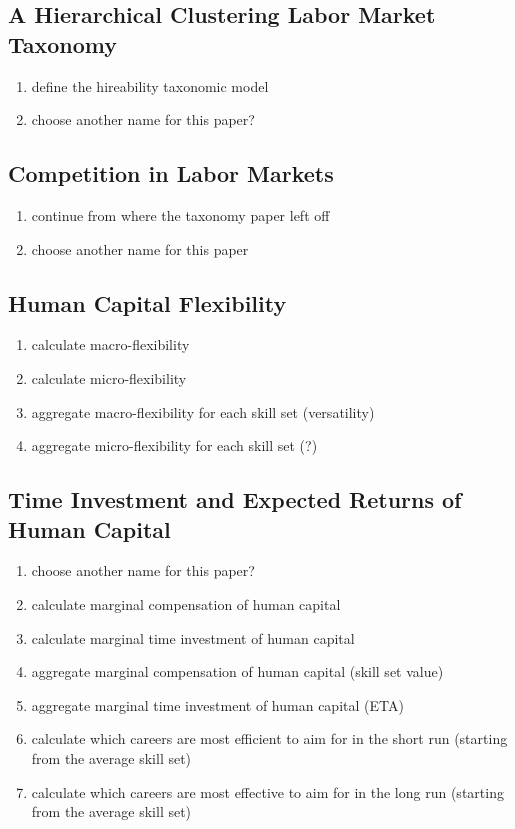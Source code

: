 \documentclass{elsarticle} %
\begin{document}
\subsection{A Hierarchical Clustering Labor Market Taxonomy}
\begin{enumerate}
    \item define the hireability taxonomic model
    \item choose another name for this paper?
\end{enumerate}

\subsection{Competition in Labor Markets}
\begin{enumerate}
    \item continue from where the taxonomy paper left off
    \item choose another name for this paper
\end{enumerate}

\subsection{Human Capital Flexibility}
\begin{enumerate}
    \item calculate macro-flexibility
    \item calculate micro-flexibility
    \item aggregate macro-flexibility for each skill set (versatility)
    \item aggregate micro-flexibility for each skill set (?)
\end{enumerate}

\subsection{Time Investment and Expected Returns of Human Capital}
\begin{enumerate}
    \item choose another name for this paper?
    \item calculate marginal compensation of human capital
    \item calculate marginal time investment of human capital
    \item aggregate marginal compensation of human capital (skill set value)
    \item aggregate marginal time investment of human capital (ETA)
    \item calculate which careers are most efficient to aim for in the short run
          (starting from the average skill set)
    \item calculate which careers are most effective to aim for in the long run (starting
          from the average skill set)
\end{enumerate}
\end{document}

